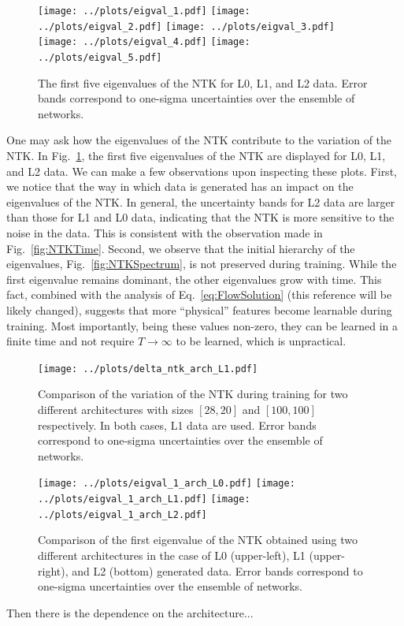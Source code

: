 \begin{figure}[h!]
  \centering
  \texttt{[image: ../plots/eigval\_1.pdf]}
  \texttt{[image: ../plots/eigval\_2.pdf]}
  \texttt{[image: ../plots/eigval\_3.pdf]}
  \texttt{[image: ../plots/eigval\_4.pdf]}
  \texttt{[image: ../plots/eigval\_5.pdf]}
  \vspace{0.5cm}
  \caption{The first five eigenvalues of the NTK for L0, L1, and L2 data. Error
  bands correspond to one-sigma uncertainties over the ensemble of networks.}
  \label{fig:EigvalsComparison}
\end{figure}
One may ask how the eigenvalues of the NTK contribute to the variation of the
NTK. In Fig.~\ref{fig:EigvalsComparison}, the first five eigenvalues of the NTK
are displayed for L0, L1, and L2 data. We can make a few observations upon
inspecting these plots. First, we notice that the way in which data is generated
has an impact on the eigenvalues of the NTK. In general, the uncertainty bands
for L2 data are larger than those for L1 and L0 data, indicating that the NTK is
more sensitive to the noise in the data. This is consistent with the observation
made in Fig.~\ref{fig:NTKTime}. Second, we observe that the initial hierarchy of
the eigenvalues, Fig.~\ref{fig:NTKSpectrum}, is not preserved during training.
While the first eigenvalue remains dominant, the other eigenvalues grow with
time. This fact, combined with the analysis of Eq.~\eqref{eq:FlowSolution}
\ac{(this reference will be likely changed)}, suggests that more ``physical''
features become learnable during training. Most importantly, being these values
non-zero, they can be learned in a finite time and not require
$T\rightarrow\infty$ to be learned, which is unpractical.

\begin{figure}[h!]
  \centering
  \texttt{[image: ../plots/delta\_ntk\_arch\_L1.pdf]}
  \caption{Comparison of the variation of the NTK during training for two
  different architectures with sizes $[28,20]$ and $[100,100]$ respectively. In
  both cases, L1 data are used. Error bands correspond to one-sigma
  uncertainties over the ensemble of networks.}
  \label{fig:NTKTimeDiffArch}
\end{figure}

\begin{figure}[h!]
  \centering
  \texttt{[image: ../plots/eigval\_1\_arch\_L0.pdf]}
  \texttt{[image: ../plots/eigval\_1\_arch\_L1.pdf]}
  \texttt{[image: ../plots/eigval\_1\_arch\_L2.pdf]}
  \vspace{0.5cm}
  \caption{Comparison of the first eigenvalue of the NTK obtained using two
  different architectures in the case of L0 (upper-left), L1 (upper-right), and
  L2 (bottom) generated data. Error bands correspond to one-sigma uncertainties
  over the ensemble of networks.}
  \label{fig:NTKvalsDiffArch}
\end{figure}
Then there is the dependence on the architecture...


